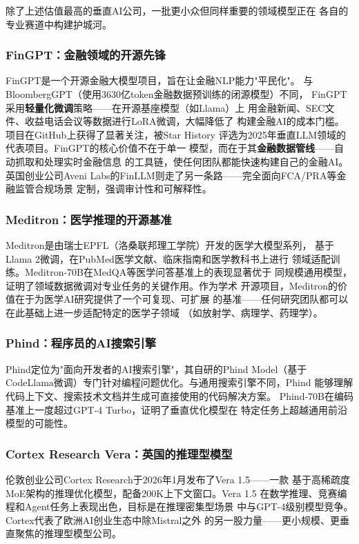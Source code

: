 除了上述估值最高的垂直AI公司，一批更小众但同样重要的领域模型正在
各自的专业赛道中构建护城河。

\subsubsection{FinGPT：金融领域的开源先锋}
FinGPT是一个开源金融大模型项目，旨在让金融NLP能力"平民化"。
与BloombergGPT（使用3630亿token金融数据预训练的闭源模型）不同，
FinGPT采用\textbf{轻量化微调}策略——在开源基座模型（如Llama）上
用金融新闻、SEC文件、收益电话会议等数据进行LoRA微调，大幅降低了
构建金融AI的成本门槛。项目在GitHub上获得了显著关注，被Star History
评选为2025年垂直LLM领域的代表项目。FinGPT的核心价值不在于单一
模型，而在于其\textbf{金融数据管线}——自动抓取和处理实时金融信息
的工具链，使任何团队都能快速构建自己的金融AI。英国创业公司Aveni
Labs的FinLLM则走了另一条路——完全面向FCA/PRA等金融监管合规场景
定制，强调审计性和可解释性。

\subsubsection{Meditron：医学推理的开源基准}
Meditron是由瑞士EPFL（洛桑联邦理工学院）开发的医学大模型系列，
基于Llama 2微调，在PubMed医学文献、临床指南和医学教科书上进行
领域适配训练。Meditron-70B在MedQA等医学问答基准上的表现显著优于
同规模通用模型，证明了领域数据微调对专业任务的关键作用。作为学术
开源项目，Meditron的价值在于为医学AI研究提供了一个可复现、可扩展
的基准——任何研究团队都可以在此基础上进一步适配特定的医学子领域
（如放射学、病理学、药理学）。

\subsubsection{Phind：程序员的AI搜索引擎}
Phind定位为"面向开发者的AI搜索引擎"，其自研的Phind Model（基于
CodeLlama微调）专门针对编程问题优化。与通用搜索引擎不同，Phind
能够理解代码上下文、搜索技术文档并生成可直接使用的代码解决方案。
Phind-70B在编码基准上一度超过GPT-4 Turbo，证明了垂直优化模型在
特定任务上超越通用前沿模型的可能性。

\subsubsection{Cortex Research Vera：英国的推理型模型}
伦敦创业公司Cortex Research于2026年1月发布了Vera 1.5——一款
基于高稀疏度MoE架构的推理优化模型，配备200K上下文窗口。Vera 1.5
在数学推理、竞赛编程和Agent任务上表现出色，目标是在推理密集型场景
中与GPT-4级别模型竞争。Cortex代表了欧洲AI创业生态中除Mistral之外
的另一股力量——更小规模、更垂直聚焦的推理型模型公司。

